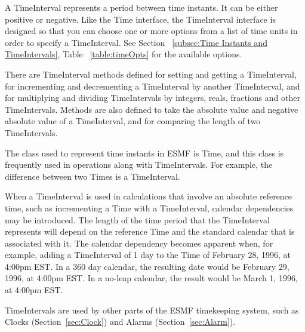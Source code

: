 \label{sec:TimeInterval}
A TimeInterval represents a period between time instants.  
It can be either positive or negative.  Like the Time interface, 
the TimeInterval interface is designed so that you can choose 
one or more options from a list of time units in order 
to specify a TimeInterval.
See Section ~\ref{subsec:Time Instants and TimeIntervals}, 
Table ~\ref{table:timeOpts} for the available options.

There are TimeInterval methods defined for setting and getting 
a TimeInterval, for incrementing and decrementing a TimeInterval 
by another TimeInterval, and for multiplying and dividing 
TimeIntervals by integers, reals, fractions and other TimeIntervals.  
Methods are also defined to take the absolute value and negative 
absolute value of a TimeInterval, and for comparing the length of two
TimeIntervals.

The class used to represent time instants in ESMF is Time,
and this class is frequently used in operations along with 
TimeIntervals.  For example, the difference between two
Times is a TimeInterval.  

When a TimeInterval is used in calculations that involve an absolute 
reference time, such as incrementing a Time with a TimeInterval, calendar 
dependencies may be introduced.  The length of the time period that the 
TimeInterval represents will depend on the reference Time and the 
standard calendar that is associated with it.  The calendar dependency becomes 
apparent when, for example, adding a TimeInterval of 1 day to the Time 
of February 28, 1996, at 4:00pm EST.  In a 360 day calendar, the 
resulting date would be February 29, 1996, at 4:00pm EST.  In a no-leap 
calendar, the result would be March 1, 1996, at 4:00pm EST.

TimeIntervals are used by other parts of the ESMF timekeeping
system, such as Clocks (Section~\ref{sec:Clock}) and Alarms 
(Section~\ref{sec:Alarm}).





